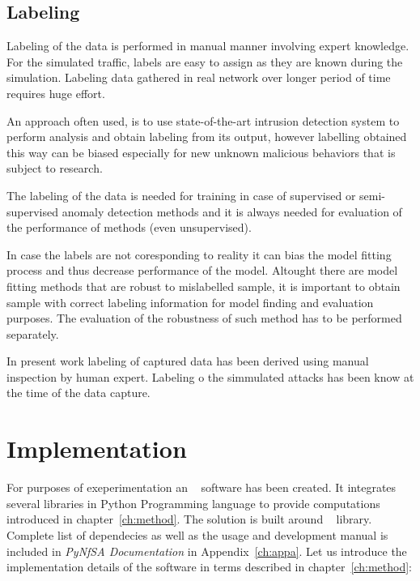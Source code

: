 \subsection{Labeling}\label{subsec:labeling}

Labeling of the data is performed in manual manner involving expert knowledge.
For the simulated traffic, labels are easy to assign as they are known during the simulation.
Labeling data gathered in real network over longer period of time
requires huge effort. 

An approach often used, %
is to use  state-of-the-art intrusion detection system to perform analysis and obtain
labeling from its output, however labelling obtained  this way
can be biased especially for new unknown malicious behaviors that is subject to research.

The labeling of the data is needed for training in case of supervised or semi-supervised
anomaly detection methods and it is always needed for evaluation of the performance of methods
(even unsupervised).

In case the labels are not coresponding to reality it can bias the model fitting process and 
thus decrease performance of the model. Altought there are model fitting methods that are 
robust to mislabelled sample, it is important to obtain sample with correct labeling
information for model finding and evaluation purposes. The evaluation of the robustness
of such method has to be performed separately.

In present work labeling of captured data has been derived using manual inspection by human expert.
Labeling o the simmulated attacks has been know at the time of the data capture.


\section{Implementation} \label{sec:sw}

For purposes of exeperimentation an ~\cite{boraros2012PyNfSA} 
software has been created. It integrates several libraries in Python Programming language
to provide computations introduced in chapter~\ref{ch:method}. The solution is built
around ~\cite{oliphant2006numpy} library. Complete list of dependecies as well as the
usage and development manual is included in \emph{PyNfSA Documentation} in Appendix~\ref{ch:appa}.
Let us introduce the implementation details of the   software in terms 
described in chapter~\ref{ch:method}:

